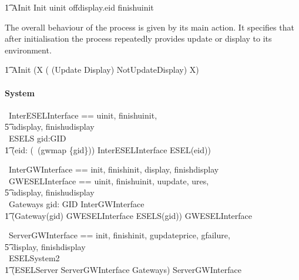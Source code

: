 \begin{circusaction}
        \t1 AInit \circdef \lschexpract Init \rschexpract \circseq uinit \then offdisplay.eid \then finishuinit \then \Skip\\
\end{circusaction}
The overall behaviour of the process is given by its main action. It specifies that after initialisation the process repeatedly provides update or display to its environment.
\begin{circusaction}
	    \t1 \circspot AInit \circseq (\circmu X \circspot ( (Update \circseq Display) \extchoice NotUpdateDisplay) \circseq X) \\
\end{circusaction}
\begin{circus}
	\circend
\end{circus}

\paragraph{System}
\begin{circus}
    \circchannelset\ InterESELInterface == \lchanset uinit, finishuinit, \\
                \t5 udisplay, finishudisplay \rchanset \\
    \circprocess\ ESELS \circdef gid:GID \circspot \\ 
        \t1 (\Parallel eid: (\dom~(gwmap \rres \{gid\})) \lpar InterESELInterface \rpar \circspot ESEL(eid)) \\
\end{circus}

\begin{circus}
    \circchannelset\ InterGWInterface == \lchanset init, finishinit, display, finishdisplay \rchanset \\
    \circchannelset\ GWESELInterface == \lchanset uinit, finishuinit, uupdate, ures, \\
                \t5 udisplay, finishudisplay \rchanset \\
    \circprocess\ Gateways \circdef \Parallel gid: GID \lpar InterGWInterface \rpar \circspot \\
        \t1 (Gateway(gid) \lpar GWESELInterface \rpar ESELS(gid)) \circhide GWESELInterface \\
\end{circus}

\begin{circus}
    \circchannelset\ ServerGWInterface == \lchanset init, finishinit, gupdateprice, gfailure, \\
                \t5 display, finishdisplay \rchanset \\
    \circprocess\ ESELSystem2 \circdef \\
        \t1 (ESELServer \lpar ServerGWInterface \rpar Gateways) \circhide ServerGWInterface 
\end{circus}
